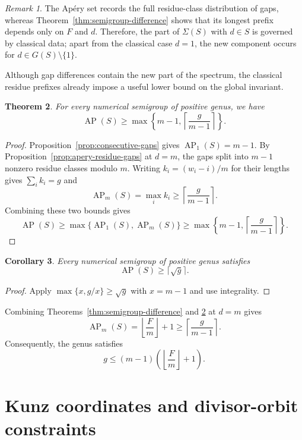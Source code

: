 \documentclass[11pt]{article}
\theoremstyle{plain}
\newtheorem{theorem}{Theorem}[section]
\newtheorem{corollary}[theorem]{Corollary}
\theoremstyle{definition}
\theoremstyle{remark}
\newtheorem{remark}[theorem]{Remark}
\newcommand{\AP}{\operatorname{AP}}
\begin{document}
\begin{remark}
The Ap\'ery set records the full residue-class distribution of gaps, whereas
Theorem~\ref{thm:semigroup-difference} shows that its longest prefix depends
only on $F$ and $d$.  Therefore, the part of $\Sigma(S)$ with $d\in S$ is
governed
by classical data; apart from the classical case $d=1$, the new component
occurs for $d\in G(S)\setminus\{1\}$.
\end{remark}

Although gap differences contain the new part of the spectrum, the classical
residue prefixes already impose a useful lower bound on the global invariant.

\begin{theorem}\label{thm:multiplicity-bound}
For every numerical semigroup of positive genus, we have
\[
  \boxed{\AP(S)\geq
  \max\left\{m-1,\left\lceil\frac{g}{m-1}\right\rceil\right\}.}
\]
\end{theorem}

\begin{proof}
Proposition~\ref{prop:consecutive-gaps} gives $\AP_1(S)=m-1$.  By
Proposition~\ref{prop:apery-residue-gaps} at $d=m$, the gaps split into
$m-1$ nonzero residue classes modulo $m$.  Writing
$k_i=(w_i-i)/m$ for their lengths gives $\sum_i k_i=g$ and
\[
  \AP_m(S)=\max_i k_i
  \geq\left\lceil\frac g{m-1}\right\rceil.
\]
Combining these two bounds gives
\[
  \AP(S)\geq\max\{\AP_1(S),\AP_m(S)\}
  \geq\max\left\{m-1,
  \left\lceil\frac g{m-1}\right\rceil\right\}.
\]
\end{proof}

\begin{corollary}\label{cor:sqrt-bound}
Every numerical semigroup of positive genus satisfies
\[
  \boxed{\AP(S)\geq\lceil\sqrt g\rceil.}
\]
\end{corollary}

\begin{proof}
Apply $\max\{x,g/x\}\geq\sqrt g$ with $x=m-1$ and use integrality.
\end{proof}

Combining Theorems~\ref{thm:semigroup-difference} and
\ref{thm:multiplicity-bound} at $d=m$ gives
\[
  \AP_m(S)=\left\lfloor\frac Fm\right\rfloor+1
  \geq\left\lceil\frac g{m-1}\right\rceil.
\]
Consequently, the genus satisfies
\[
  g\leq(m-1)\left(\left\lfloor\frac Fm\right\rfloor+1\right).
\]
\section{Kunz coordinates and divisor-orbit constraints}
\label{sec:kunz-orbits}
\end{document}
